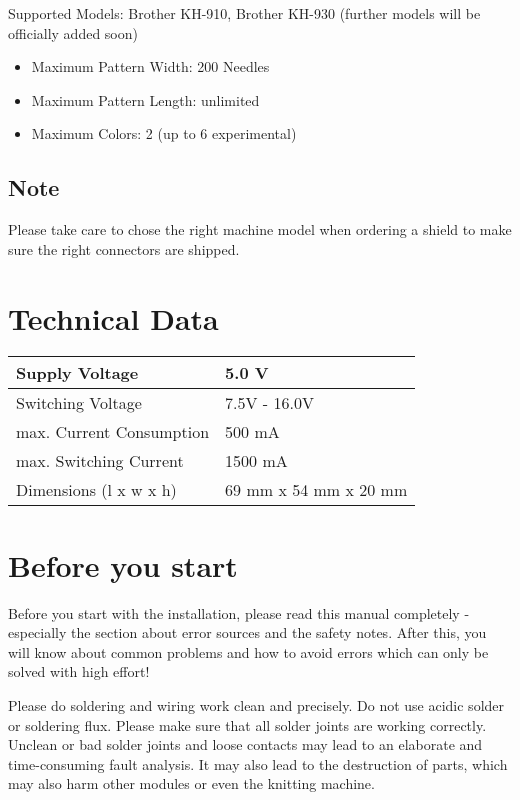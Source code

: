 \documentclass[fleqn,10pt]{SelfArx} %
\begin{document}
Supported Models: Brother KH-910, Brother KH-930 (further models will be officially added soon)
\begin{itemize}[noitemsep] %
\item Maximum Pattern Width: 200 Needles
\item Maximum Pattern Length: unlimited
\item Maximum Colors: 2 (up to 6 experimental)
\end{itemize}

 \subsection*{Note}

Please take care to chose the right machine model when ordering a shield to make sure the right connectors are shipped.


\section{Technical Data}

\begin{tabular}{ll}
Supply Voltage            & 5.0 V              \\ \hline
Switching Voltage         & 7.5V - 16.0V       \\ \hline
max. Current Consumption  & 500 mA             \\ \hline
max. Switching Current    & 1500 mA            \\ \hline
Dimensions (l x w x h)    & 69 mm x 54 mm x 20 mm
\end{tabular}



\section{Before you start}

Before you start with the installation, please read this manual completely - especially the section about error sources and the safety notes. After this, you will know about common problems and how to avoid errors which can only be solved with high effort!

Please do soldering and wiring work clean and precisely. Do not use acidic solder or soldering flux. Please make sure that all solder joints are working correctly. Unclean or bad solder joints and loose contacts may lead to an elaborate and time-consuming fault analysis. It may also lead to the destruction of parts, which may also harm other modules or even the knitting machine.
\end{document}
